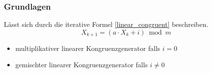 \begin{frame}
	\frametitle{Grundlagen}
	Lässt sich durch die iterative Formel \ref{linear_congruent} beschreiben.
	\begin{equation}
		\label{linear_congruent}
		X_{k+1} = (a \cdot X_{k} + i) \bmod m
	\end{equation}
	\begin{itemize}
		\item multiplikativer linearer Kongruenzgenerator falls $i = 0$
		\item gemischter linearer Kongruenzgenerator falls $i \neq 0$
	\end{itemize}
\end{frame}
